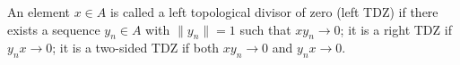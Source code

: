 An element $x \in A$ is called a left topological divisor of zero (left TDZ) if there exists a sequence $y_n \in A$ with $\|y_n\| = 1$ such that $x y_n \to 0$; it is a right TDZ if $y_n x \to 0$; it is a two-sided TDZ if both $x y_n \to 0$ and $y_n x \to 0$.
